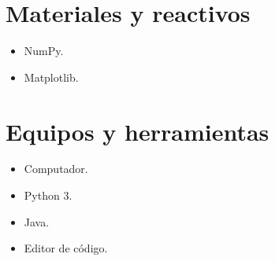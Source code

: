 \documentclass[11pt,a4paper]{article}
\begin{document}
\section{Materiales y reactivos}
\begin{itemize}
    \item NumPy.
    \item Matplotlib.
\end{itemize}

\section{Equipos y herramientas}
\begin{itemize}
    \item Computador.
    \item Python 3.
    \item Java.
    \item Editor de código.
\end{itemize}
\end{document}
